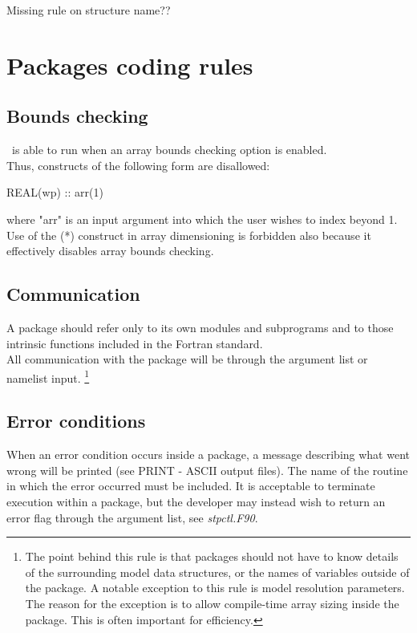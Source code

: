 Missing rule on structure name??

\section{Packages coding rules}

\subsection{Bounds checking}

\NEMO\ is able to run when an array bounds checking option is enabled. \\
Thus, constructs of the following form are disallowed:

\begin{forlines}
REAL(wp) :: arr(1)
\end{forlines}

where "arr" is an input argument into which the user wishes to index beyond 1.
Use of the (*) construct in array dimensioning is forbidden also because
it effectively disables array bounds checking.

\subsection{Communication}

A package should refer only to its own modules and subprograms and to those intrinsic functions included in
the Fortran standard. \\
All communication with the package will be through the argument list or namelist input.
\footnote{
  The point behind this rule is that packages should not have to know details of
  the surrounding model data structures, or the names of variables outside of the package.
  A notable exception to this rule is model resolution parameters.
  The reason for the exception is to allow compile-time array sizing inside the package.
  This is often important for efficiency.
}

\subsection{Error conditions}

When an error condition occurs inside a package, a message describing what went wrong will be printed
(see PRINT - ASCII output files).
The name of the routine in which the error occurred must be included.
It is acceptable to terminate execution within a package, but
the developer may instead wish to return an error flag through the argument list,
see \textit{stpctl.F90}.

